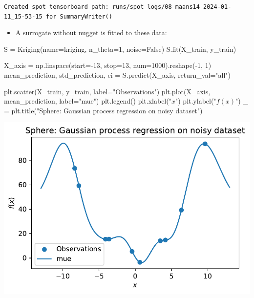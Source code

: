 \documentclass[
  letterpaper,
  DIV=11,
  numbers=noendperiod]{scrreprt}
\newenvironment{Shaded}{\begin{snugshade}}{\end{snugshade}}
\newcommand{\DecValTok}[1]{\textcolor[rgb]{0.68,0.00,0.00}{#1}}
\newcommand{\NormalTok}[1]{\textcolor[rgb]{0.00,0.23,0.31}{#1}}
\newcommand{\OperatorTok}[1]{\textcolor[rgb]{0.37,0.37,0.37}{#1}}
\newcommand{\StringTok}[1]{\textcolor[rgb]{0.13,0.47,0.30}{#1}}
\newcommand{\VariableTok}[1]{\textcolor[rgb]{0.07,0.07,0.07}{#1}}
\providecommand{\tightlist}{%
  \setlength{\itemsep}{0pt}\setlength{\parskip}{0pt}}\usepackage{longtable,booktabs,array}
\begin{document}
\begin{verbatim}
Created spot_tensorboard_path: runs/spot_logs/08_maans14_2024-01-11_15-53-15 for SummaryWriter()
\end{verbatim}

\begin{itemize}
\tightlist
\item
  A surrogate without nugget is fitted to these data:
\end{itemize}

\begin{Shaded}
\begin{Highlighting}[]
\NormalTok{S }\OperatorTok{=}\NormalTok{ Kriging(name}\OperatorTok{=}\StringTok{\textquotesingle{}kriging\textquotesingle{}}\NormalTok{,}
\NormalTok{            n\_theta}\OperatorTok{=}\DecValTok{1}\NormalTok{,}
\NormalTok{            noise}\OperatorTok{=}\VariableTok{False}\NormalTok{)}
\NormalTok{S.fit(X\_train, y\_train)}

\NormalTok{X\_axis }\OperatorTok{=}\NormalTok{ np.linspace(start}\OperatorTok{={-}}\DecValTok{13}\NormalTok{, stop}\OperatorTok{=}\DecValTok{13}\NormalTok{, num}\OperatorTok{=}\DecValTok{1000}\NormalTok{).reshape(}\OperatorTok{{-}}\DecValTok{1}\NormalTok{, }\DecValTok{1}\NormalTok{)}
\NormalTok{mean\_prediction, std\_prediction, ei }\OperatorTok{=}\NormalTok{ S.predict(X\_axis, return\_val}\OperatorTok{=}\StringTok{"all"}\NormalTok{)}

\NormalTok{plt.scatter(X\_train, y\_train, label}\OperatorTok{=}\StringTok{"Observations"}\NormalTok{)}
\NormalTok{plt.plot(X\_axis, mean\_prediction, label}\OperatorTok{=}\StringTok{"mue"}\NormalTok{)}
\NormalTok{plt.legend()}
\NormalTok{plt.xlabel(}\StringTok{"$x$"}\NormalTok{)}
\NormalTok{plt.ylabel(}\StringTok{"$f(x)$"}\NormalTok{)}
\NormalTok{\_ }\OperatorTok{=}\NormalTok{ plt.title(}\StringTok{"Sphere: Gaussian process regression on noisy dataset"}\NormalTok{)}
\end{Highlighting}
\end{Shaded}

\includegraphics{013_num_spot_noisy_files/figure-pdf/cell-14-output-1.pdf}
\end{document}
